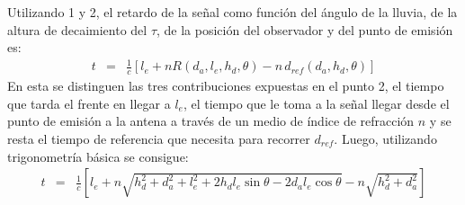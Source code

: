 	Utilizando 1 y 2, el retardo de la señal como función del ángulo de la lluvia, de la altura de decaimiento del $\tau$, de la posición del observador y del punto de emisión es:
	\begin{equation}
	\begin{array}{rcl}
	t & = & \frac{1}{c}\left[l_e+nR(d_a,l_e,h_d,\theta)-n\,d_{ref}(d_a,h_d,\theta)\right]
	\end{array}
	\label{eq:toytimedelay1}
	\end{equation}
	En esta se distinguen las tres contribuciones expuestas en el punto 2, el tiempo que tarda el frente en llegar a $l_e$, el tiempo que le toma a la señal llegar desde el punto de emisión a la antena a través de un medio de índice de refracción $n$ y se resta el tiempo de referencia que necesita para recorrer $d_{ref}$.
	Luego, utilizando trigonometría básica se consigue:
	\begin{equation}
	\begin{array}{rcl}
	t & =  & 
	 \frac{1}{c}\left[l_e +
		n \sqrt{h_d^2+d_a^2+l_e^2+2h_dl_e \sin\theta - 2d_al_e\cos\theta} 
		-
		n \sqrt{h_d^2+d_a^2}
		\right]
	\end{array}
	\label{eq:toytimedelay2}
	\end{equation}
	
